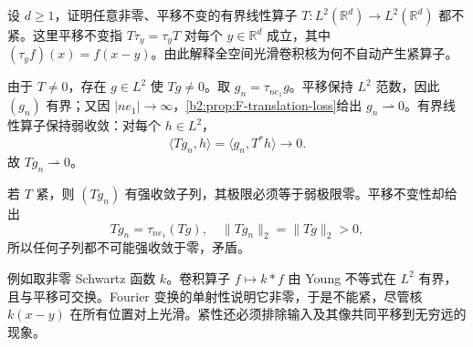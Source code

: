 \begin{exercise}\label{b2:ex:app-G-2}
设 \(d\ge1\)，证明任意非零、平移不变的有界线性算子
\(T:L^2(\mathbb R^d)\to L^2(\mathbb R^d)\) 都不紧。这里平移不变指
\(T\tau_y=\tau_yT\) 对每个 \(y\in\mathbb R^d\) 成立，其中
\((\tau_yf)(x)=f(x-y)\)。由此解释全空间光滑卷积核为何不自动产生紧算子。
\end{exercise}
\begin{solution}
由于 \(T\ne0\)，存在 \(g\in L^2\) 使 \(Tg\ne0\)。取
\(g_n=\tau_{ne_1}g\)。平移保持 \(L^2\) 范数，因此 \((g_n)\) 有界；又因 \(|ne_1|\to\infty\)，\cref{b2:prop:F-translation-loss}给出 \(g_n\rightharpoonup0\)。有界线性算子保持弱收敛：对每个 \(h\in L^2\)，
\[
 \langle Tg_n,h\rangle=\langle g_n,T^*h\rangle\longrightarrow0.
\]
故 \(Tg_n\rightharpoonup0\)。

若 \(T\) 紧，则 \((Tg_n)\) 有强收敛子列，其极限必须等于弱极限零。平移不变性却给出
\[
 Tg_n=\tau_{ne_1}(Tg),
 \quad\|Tg_n\|_2=\|Tg\|_2>0,
\]
所以任何子列都不可能强收敛于零，矛盾。

例如取非零 Schwartz 函数 \(k\)。卷积算子 \(f\mapsto k*f\) 由 Young 不等式在 \(L^2\) 有界，且与平移可交换。Fourier 变换的单射性说明它非零，于是不能紧，尽管核 \(k(x-y)\) 在所有位置对上光滑。紧性还必须排除输入及其像共同平移到无穷远的现象。
\end{solution}

